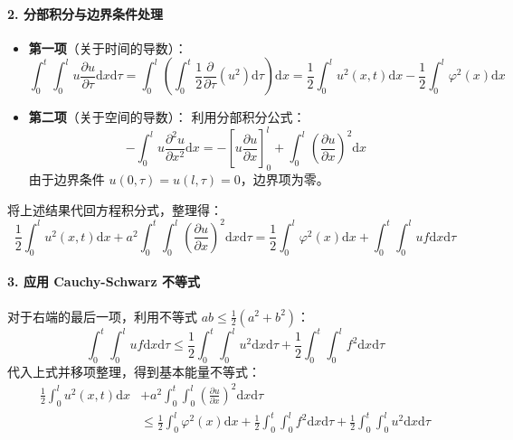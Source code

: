 \documentclass[12pt,a4paper]{ctexart}
\begin{document}
	\paragraph{2. 分部积分与边界条件处理}
	\begin{itemize}
		\item \textbf{第一项}（关于时间的导数）：
		\[
		\int_0^t \int_0^l u \frac{\partial u}{\partial \tau} \mathrm{d}x \mathrm{d}\tau = \int_0^l \left( \int_0^t \frac{1}{2} \frac{\partial}{\partial \tau} (u^2) \mathrm{d}\tau \right) \mathrm{d}x = \frac{1}{2} \int_0^l u^2(x,t) \mathrm{d}x - \frac{1}{2} \int_0^l \varphi^2(x) \mathrm{d}x
		\]
		\item \textbf{第二项}（关于空间的导数）：
		利用分部积分公式：
		\[
		- \int_0^l u \frac{\partial^2 u}{\partial x^2} \mathrm{d}x = - \left[ u \frac{\partial u}{\partial x} \right]_{0}^{l} + \int_0^l \left( \frac{\partial u}{\partial x} \right)^2 \mathrm{d}x
		\]
		由于边界条件 $u(0,\tau) = u(l,\tau) = 0$，边界项为零。
	\end{itemize}
	将上述结果代回方程积分式，整理得：
	\begin{equation}
		\frac{1}{2} \int_0^l u^2(x,t) \mathrm{d}x + a^2 \int_0^t \int_0^l \left( \frac{\partial u}{\partial x} \right)^2 \mathrm{d}x \mathrm{d}\tau = \frac{1}{2} \int_0^l \varphi^2(x) \mathrm{d}x + \int_0^t \int_0^l u f \mathrm{d}x \mathrm{d}\tau
	\end{equation}
	
	\paragraph{3. 应用 Cauchy-Schwarz 不等式}
	对于右端的最后一项，利用不等式 $ab \leqslant \frac{1}{2}(a^2 + b^2)$：
	\[
	\int_0^t \int_0^l u f \mathrm{d}x \mathrm{d}\tau \leqslant \frac{1}{2} \int_0^t \int_0^l u^2 \mathrm{d}x \mathrm{d}\tau + \frac{1}{2} \int_0^t \int_0^l f^2 \mathrm{d}x \mathrm{d}\tau
	\]
	代入上式并移项整理，得到基本能量不等式：
	\begin{align}
		\frac{1}{2} \int_0^l u^2(x,t) \mathrm{d}x &+ a^2 \int_0^t \int_0^l \left( \frac{\partial u}{\partial x} \right)^2 \mathrm{d}x \mathrm{d}\tau \nonumber \\
		&\leqslant \frac{1}{2} \int_0^l \varphi^2(x) \mathrm{d}x + \frac{1}{2} \int_0^t \int_0^l f^2 \mathrm{d}x \mathrm{d}\tau + \frac{1}{2} \int_0^t \int_0^l u^2 \mathrm{d}x \mathrm{d}\tau
		\label{eq:energy_pre}
	\end{align}
	
\end{document}
